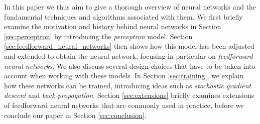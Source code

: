 In this paper we thus aim to give a thorough overview of neural networks and the fundamental techniques and algorithms associated with them. We first briefly examine the motivation and history behind neural networks in Section \ref{sec:perceptron} by introducing the \emph{perceptron} model. Section \ref{sec:feedforward_neural_networks} then shows how this model has been adjusted and extended to obtain the neural network, focusing in particular on \emph{feedforward neural networks}. We also discuss several design choices that have to be taken into account when working with these models. In Section \ref{sec:training}, we explain how these networks can be trained, introducing ideas such as \emph{stochastic gradient descent} and \emph{back-propagation}. Section \ref{sec:extensions} briefly examines extensions of feedforward neural networks that are commonly used in practice, before we conclude our paper in Section \ref{sec:conclusion}.